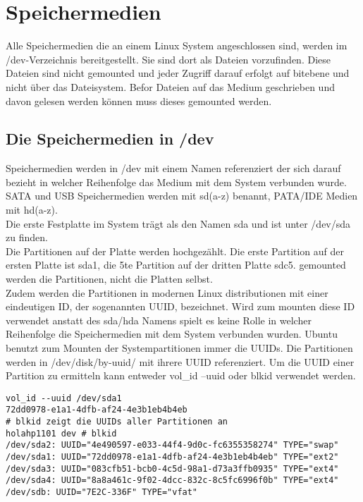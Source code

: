 \section{Speichermedien}
Alle Speichermedien die an einem Linux System angeschlossen sind, werden im /dev-Verzeichnis bereitgestellt. Sie sind dort als Dateien vorzufinden. Diese Dateien sind nicht gemounted und jeder Zugriff darauf erfolgt auf bitebene und nicht \"uber das Dateisystem. Befor Dateien auf das Medium geschrieben und davon gelesen werden k\"onnen muss dieses gemounted werden.\\
\subsection{Die Speichermedien in /dev}
Speichermedien werden in /dev mit einem Namen referenziert der sich darauf bezieht in welcher Reihenfolge das Medium mit dem System verbunden wurde.
SATA und USB Speichermedien werden mit sd(a-z) benannt, PATA/IDE Medien mit hd(a-z).\\
Die erste Festplatte im System tr\"agt als den Namen sda und ist unter /dev/sda zu finden.\\
Die Partitionen auf der Platte werden hochgez\"ahlt. Die erste Partition auf der ersten Platte ist sda1, die 5te Partition auf der dritten Platte sdc5. gemounted werden die Partitionen, nicht die Platten selbst.\\
Zudem werden die Partitionen in modernen Linux distributionen mit einer eindeutigen ID, der sogenannten UUID, bezeichnet. Wird zum mounten diese ID verwendet anstatt des sda/hda Namens spielt es keine Rolle in welcher Reihenfolge die Speichermedien mit dem System verbunden wurden. Ubuntu benutzt zum Mounten der Systempartitionen immer die UUIDs. Die Partitionen werden in /dev/disk/by-uuid/ mit ihrere UUID referenziert. Um die UUID einer Partition zu ermitteln kann entweder vol\_id --uuid oder blkid verwendet werden.
\begin{lstlisting}[frame=single]
vol_id --uuid /dev/sda1
72dd0978-e1a1-4dfb-af24-4e3b1eb4b4eb
# blkid zeigt die UUIDs aller Partitionen an
holahp1101 dev # blkid 
/dev/sda2: UUID="4e490597-e033-44f4-9d0c-fc6355358274" TYPE="swap" 
/dev/sda1: UUID="72dd0978-e1a1-4dfb-af24-4e3b1eb4b4eb" TYPE="ext2" 
/dev/sda3: UUID="083cfb51-bcb0-4c5d-98a1-d73a3ffb0935" TYPE="ext4" 
/dev/sda4: UUID="8a8a461c-9f02-4dcc-832c-8c5fc6996f0b" TYPE="ext4" 
/dev/sdb: UUID="7E2C-336F" TYPE="vfat" 
\end{lstlisting}
